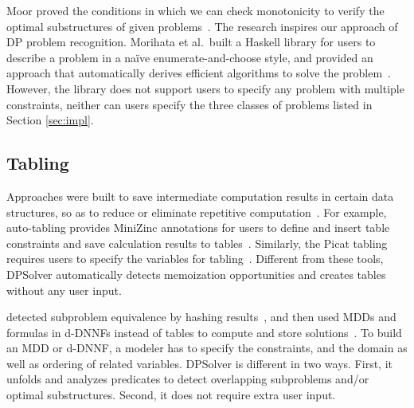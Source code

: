 Moor proved the conditions in which we can check monotonicity to verify the optimal substructures of given problems~\cite{Moor1994Categories}. The research inspires our approach of DP problem recognition.
Morihata et al.~built a Haskell library for users to describe a problem in a na\"ive enumerate-and-choose style, and provided an approach that automatically derives efficient algorithms to solve the problem~\cite{Morihata2014Dynamic}. However, the library does not support users to specify any problem with multiple constraints, neither can users specify the three classes of problems listed in Section \ref{sec:impl}.




\subsection{Tabling}
\label{sec:table_related}

Approaches were built to save intermediate computation results in certain data structures, so as to reduce or eliminate repetitive computation~\cite{zhou2015constraint,dekker2017auto,de2019compiling}. For example, 
auto-tabling provides MiniZinc annotations for users to define and insert table constraints and save calculation results to tables~\cite{dekker2017auto}.
Similarly, the Picat tabling requires users to specify the variables for tabling~\cite{zhou2015constraint}. Different from these tools, DPSolver automatically detects memoization opportunities and creates tables without any user input.

\citeauthor{de2019compiling} detected subproblem equivalence by hashing results~\cite{chu2012exploiting}, and then used MDDs and formulas in d-DNNFs instead of tables to compute and store solutions~\cite{de2019compiling}. To build an MDD or d-DNNF, a modeler has to specify the constraints, and the domain as well as ordering of related variables. DPSolver is different in two ways. First, it unfolds and analyzes predicates to detect overlapping subproblems and/or optimal substructures. Second, it does not require extra user input.